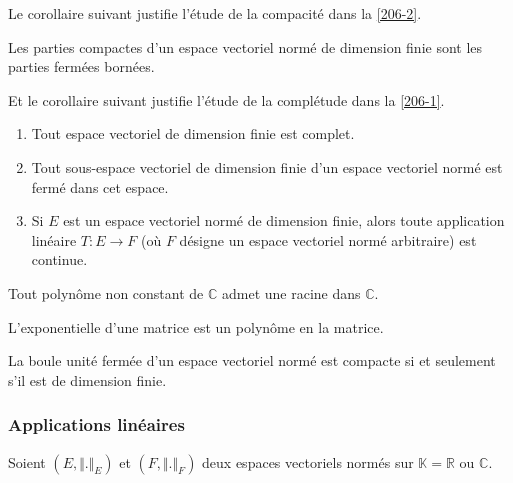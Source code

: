   Le corollaire suivant justifie l'étude de la compacité dans la \cref{206-2}.

  \begin{corollary}
    Les parties compactes d'un espace vectoriel normé de dimension finie sont les parties fermées bornées.
  \end{corollary}

  Et le corollaire suivant justifie l'étude de la complétude dans la \cref{206-1}.

  \begin{corollary}
    \begin{enumerate}[label={\bfseries(\roman*)}]
      \item Tout espace vectoriel de dimension finie est complet.
      \item Tout sous-espace vectoriel de dimension finie d'un espace vectoriel normé est fermé dans cet espace.
      \item Si $E$ est un espace vectoriel normé de dimension finie, alors toute application linéaire $T : E \rightarrow F$ (où $F$ désigne un espace vectoriel normé arbitraire) est continue.
    \end{enumerate}
  \end{corollary}


  \begin{application}
    Tout polynôme non constant de $\mathbb{C}$ admet une racine dans $\mathbb{C}$.
  \end{application}


  \begin{application}
    L'exponentielle d'une matrice est un polynôme en la matrice.
  \end{application}


  \begin{theorem}
    La boule unité fermée d'un espace vectoriel normé est compacte si et seulement s'il est de dimension finie.
  \end{theorem}

  \subsubsection{Applications linéaires}


  Soient $(E, \Vert . \Vert_E)$ et $(F, \Vert . \Vert_F)$ deux espaces vectoriels normés sur $\mathbb{K} = \mathbb{R}$ ou $\mathbb{C}$.


